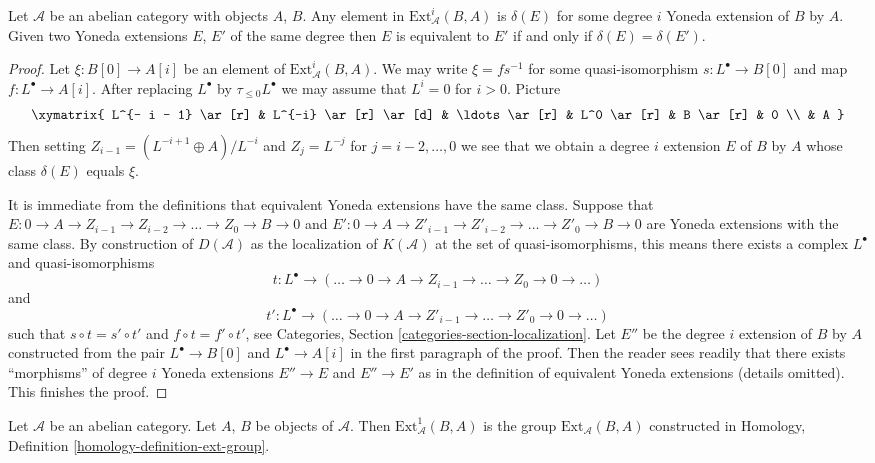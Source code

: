 \begin{lemma}
\label{lemma-yoneda-extension}
Let $\mathcal{A}$ be an abelian category with objects $A$, $B$.
Any element in $\text{Ext}^i_\mathcal{A}(B, A)$ is $\delta(E)$
for some degree $i$ Yoneda extension of $B$ by $A$.
Given two Yoneda extensions $E$, $E'$ of the same degree
then $E$ is equivalent to $E'$ if and only if $\delta(E) = \delta(E')$.
\end{lemma}

\begin{proof}
Let $\xi : B[0] \to A[i]$ be an element of $\text{Ext}^i_\mathcal{A}(B, A)$.
We may write $\xi = f s^{-1}$ for some quasi-isomorphism
$s : L^\bullet \to B[0]$ and map $f : L^\bullet \to A[i]$.
After replacing $L^\bullet$ by $\tau_{\leq 0}L^\bullet$ we may assume
that $L^i = 0$ for $i > 0$. Picture
$$
\xymatrix{
L^{- i - 1} \ar[r] & L^{-i} \ar[r] \ar[d] & \ldots \ar[r] &
L^0 \ar[r] & B \ar[r] & 0 \\
& A
}
$$
Then setting $Z_{i - 1} = (L^{- i + 1} \oplus A)/L^{-i}$ and
$Z_j = L^{-j}$ for $j = i - 2, \ldots, 0$ we see that we obtain a
degree $i$ extension $E$ of $B$ by $A$ whose class $\delta(E)$ equals
$\xi$.

\medskip\noindent
It is immediate from the definitions that equivalent Yoneda extensions
have the same class. Suppose that
$E : 0 \to A \to Z_{i - 1} \to Z_{i - 2} \to \ldots \to Z_0 \to B \to 0$ and
$E' : 0 \to A \to Z'_{i - 1} \to Z'_{i - 2} \to \ldots \to Z'_0 \to B \to 0$
are Yoneda extensions with the same class.
By construction of $D(\mathcal{A})$ as the localization
of $K(\mathcal{A})$ at the set of quasi-isomorphisms, this means there
exists a complex $L^\bullet$ and quasi-isomorphisms
$$
t : L^\bullet \to
(\ldots \to 0 \to A \to Z_{i - 1} \to \ldots \to Z_0 \to 0 \to \ldots)
$$
and
$$
t' : L^\bullet \to
(\ldots \to 0 \to A \to Z'_{i - 1} \to \ldots \to Z'_0 \to 0 \to \ldots)
$$
such that $s \circ t = s' \circ t'$ and $f \circ t = f' \circ t'$, see
Categories, Section \ref{categories-section-localization}.
Let $E''$ be the degree $i$ extension of $B$ by $A$ constructed from
the pair $L^\bullet \to B[0]$ and $L^\bullet \to A[i]$ in the first
paragraph of the proof. Then the reader sees readily that there exists
``morphisms'' of degree $i$ Yoneda extensions $E'' \to E$ and $E'' \to E'$
as in the definition of equivalent Yoneda extensions (details omitted).
This finishes the proof.
\end{proof}

\begin{lemma}
\label{lemma-ext-1}
Let $\mathcal{A}$ be an abelian category. Let $A$, $B$ be objects
of $\mathcal{A}$. Then $\text{Ext}^1_\mathcal{A}(B, A)$ is
the group $\text{Ext}_\mathcal{A}(B, A)$ constructed in
Homology, Definition \ref{homology-definition-ext-group}.
\end{lemma}

